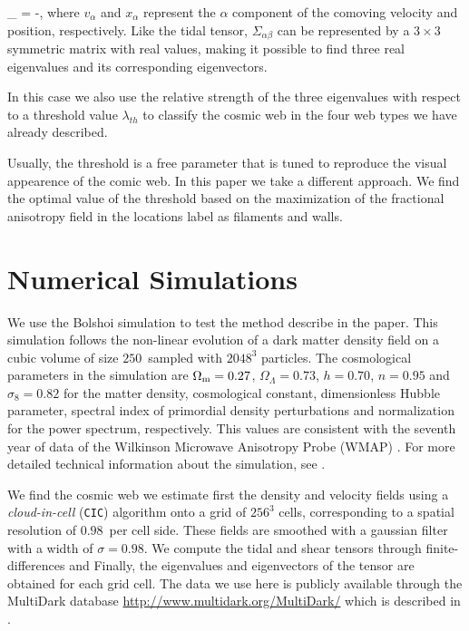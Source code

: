\documentclass[a4,useAMS,usenatbib,usegraphicx]{latex/mn2e}
\begin{document}
{	\Sigma_{\alpha\beta} = -,}
where $v_{\alpha}$ and $x_{\alpha}$ represent the $\alpha$ component of 
the comoving velocity and position, respectively. Like the tidal tensor, 
$\Sigma_{\alpha\beta}$ can be represented by a $3\times 3$ symmetric 
matrix with real values, making it possible to find three real
eigenvalues and its corresponding eigenvectors.

In this case we also use the relative strength of the three eigenvalues with 
respect to a threshold value $\lambda_{th}$ to classify the cosmic web
in the four web types we have already described.

Usually, the threshold is a free parameter that is tuned to reproduce
the visual appearence of the comic web. 
In this paper we take a different approach.
We find the optimal value of the threshold based on the maximization
of the fractional anisotropy field in the locations label as filaments
and walls. 


\section{Numerical Simulations}
\label{sec:simulations}

We use the Bolshoi simulation to test the method describe in the
paper. 
This simulation follows the non-linear evolution of a dark
matter density field on a cubic volume of  size $250$\hMpc\ sampled
with $2048^3$ particles. 
The cosmological parameters in the simulation are $\Omega_{\rm m}=0.27$,  $\Omega_{\Lambda}  =0.73$, $h=0.70$,
$n=0.95$ and $\sigma_{8}=0.82$ for the matter density,   cosmological
constant, dimensionless Hubble parameter, spectral index of
primordial density perturbations and normalization for the power
spectrum, respectively. 
This values are consistent with the seventh year of data of the Wilkinson 
Microwave Anisotropy Probe (WMAP) \citep{Jarosik11}. 
For more detailed  technical information about the simulation, see
\citet{Klypin11}. 


We find the cosmic web we estimate first the density and velocity
fields using a  \textit{cloud-in-cell} (\texttt{CIC}) algorithm onto a grid of $256^3$ 
cells, corresponding to a spatial resolution of $0.98$\hMpc\ per cell
side.  
These fields are smoothed with a gaussian filter with a width of
$\sigma=0.98$\hMpc.
We compute the tidal and shear tensors through finite-differences and
Finally, the eigenvalues and eigenvectors of the tensor are
obtained for each grid cell.
The data we use here is publicly available through the MultiDark
database \url{http://www.multidark.org/MultiDark/} which is described
in \citet{Riebe11}.
\end{document}

